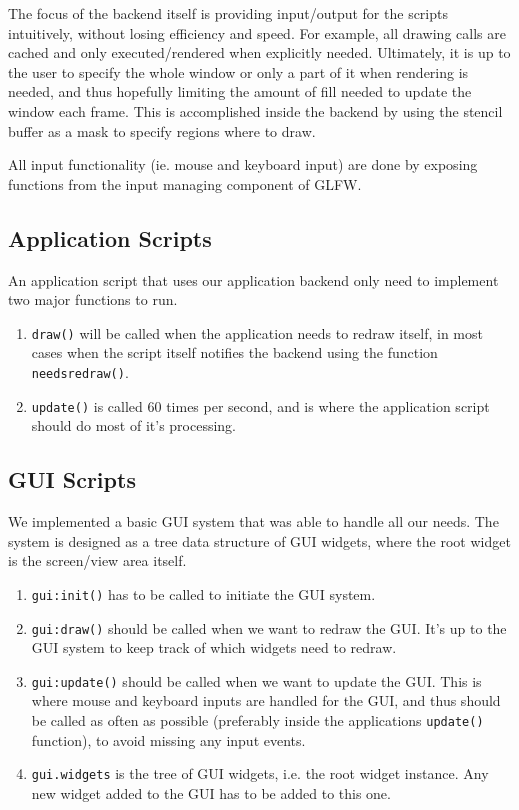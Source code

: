 The focus of the backend itself is providing input/output for the scripts intuitively, without losing efficiency and speed. For example, all drawing calls are cached and only executed/rendered when explicitly needed. Ultimately, it is up to the user to specify the whole window or only a part of it when rendering is needed, and thus hopefully limiting the amount of fill needed to update the window each frame. This is accomplished inside the backend by using the stencil buffer as a mask to specify regions where to draw.

All input functionality (ie. mouse and keyboard input) are done by exposing functions from the input managing component of GLFW.

\subsection{Application Scripts}
An application script that uses our application backend only need to implement two major functions to run.
\begin{enumerate}
  \item \texttt{draw()} will be called when the application needs to redraw itself, in most cases when the script itself notifies the backend using the function \texttt{needsredraw()}.
  \item \texttt{update()} is called 60 times per second, and is where the application script should do most of it's processing.
\end{enumerate}

\subsection{GUI Scripts}
We implemented a basic GUI system that was able to handle all our needs. The system is designed as a tree data structure of GUI widgets, where the root widget is the screen/view area itself.
\begin{enumerate}
  \item \texttt{gui:init()} has to be called to initiate the GUI system.
  \item \texttt{gui:draw()} should be called when we want to redraw the GUI. It's up to the GUI system to keep track of which widgets need to redraw.
  \item \texttt{gui:update()} should be called when we want to update the GUI. This is where mouse and keyboard inputs are handled for the GUI, and thus should be called as often as possible (preferably inside the applications \texttt{update()} function), to avoid missing any input events.
  \item \texttt{gui.widgets} is the tree of GUI widgets, i.e. the root widget instance. Any new widget added to the GUI has to be added to this one.
\end{enumerate}

